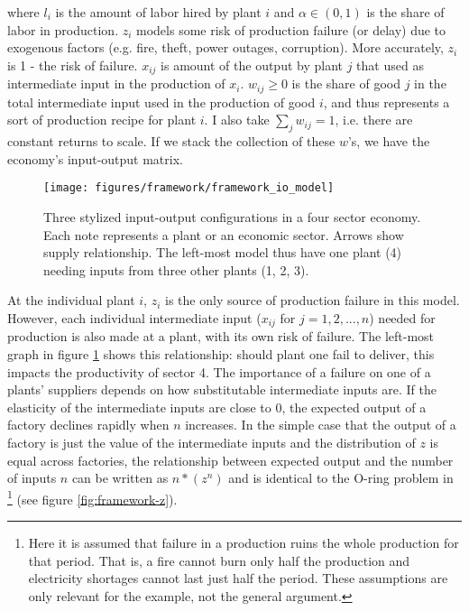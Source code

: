 \documentclass[11pt]{article}
\begin{document}
where \(l_i\) is the amount of labor hired by plant \(i\) and \(\alpha \in (0, 1)\) is the share of labor in production. \(z_i\) models some risk of production failure (or delay) due to exogenous factors (e.g. fire, theft, power outages, corruption). More accurately, \(z_i\) is 1 - the risk of failure. \(x_{ij}\) is amount of the output by plant \(j\) that used as intermediate input in the production of \(x_i\). \(w_{ij} \geq 0\) is the share of good \(j\) in the total intermediate input used in the production of good \(i\), and thus represents a sort of production recipe for plant \(i\). I also take \(\sum_j w_{ij} = 1\), i.e. there are constant returns to scale. If we stack the collection of  these \(w\)'s, we have the economy's input-output matrix.

\begin{figure}[htpb]
	\centering
	\texttt{[image: figures/framework/framework\_io\_model]}
	\caption{Three stylized input-output configurations in a four sector economy. Each note represents a plant or an economic sector. Arrows show supply relationship. The left-most model thus have one plant (4) needing inputs from three other plants (1, 2, 3).}%
	\label{fig:framework-io-model}
\end{figure}

At the individual plant \(i\), \(z_i\) is the only source of production failure in this model. However, each individual intermediate input (\(x_{ij}\) for \(j = 1, 2, ..., n\)) needed for production is also made at a plant, with its own risk of failure. The left-most graph in figure \ref{fig:framework-io-model} shows this relationship: should plant one fail to deliver, this impacts the productivity of sector 4. The importance of a failure on one of a plants' suppliers depends on how substitutable intermediate inputs are. If the elasticity of the intermediate inputs are close to 0, the expected output of a factory declines rapidly when \(n\) increases. In the simple case that the output of a factory is just the value of the intermediate inputs and the distribution of \(z\) is equal across factories, the relationship between expected output and the number of inputs \(n\) can be written as \(n*(z^{n})\) and is identical to the O-ring problem in \cite{kremer_o-ring_1993}\footnote{Here it is assumed that failure in a production ruins the whole production for that period. That is, a fire cannot burn only half the production and electricity shortages cannot last just half the period. These assumptions are only relevant for the example, not the general argument.} (see figure \ref{fig:framework-z}).
\end{document}
